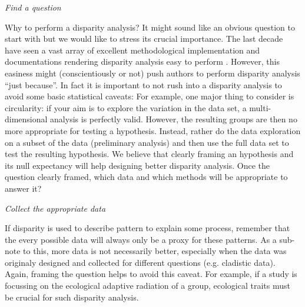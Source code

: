 \documentclass[12pt,letterpaper]{article}
\renewcommand{\subsection}[1]{%
\bigskip
\begin{center}
\begin{large}
\normalfont\itshape #1
\end{large}
\end{center}}
\begin{document}
\subsection{Find a question}
Why to perform a disparity analysis?
It might sound like an obvious question to start with but we would like to stress its crucial importance.
The last decade have seen a vast array of excellent methodological implementation and documentations rendering disparity analysis easy to perform \citep{bouxin2005ginkgo,oksanen2007vegan,geiger2008,zelditch2012geometric,adams2013geomorph,Claddis,dispRityv02,adams2017geometric}.
However, this easiness might (conscientiously or not) push authors to perform disparity analysis ``just because''.
In fact it is important to not rush into a disparity analysis to avoid some basic statistical caveats:
For example, one major thing to consider is circularity: if your aim is to explore the variation in the data set, a multi-dimensional analysis is perfectly valid.
However, the resulting groups are then no more appropriate for testing a hypothesis.
Instead, rather do the data exploration on a subset of the data (preliminary analysis) and then use the full data set to test the resulting hypothesis.
We believe that clearly framing an hypothesis and its null expectancy will help designing better disparity analysis.
Once the question clearly framed, which data and which methods will be appropriate to answer it?


\subsection{Collect the appropriate data}
If disparity is used to describe pattern to explain some process, remember that the every possible data will always only be a proxy for these patterns.
As a sub-note to this, more data is not necessarily better, especially when the data was originaly designed and collected for different questions (e.g. cladistic data).
Again, framing the question helps to avoid this caveat.
For example, if a study is focussing on the ecological adaptive radiation of a group, ecological traits must be crucial for such disparity analysis.
\end{document}
